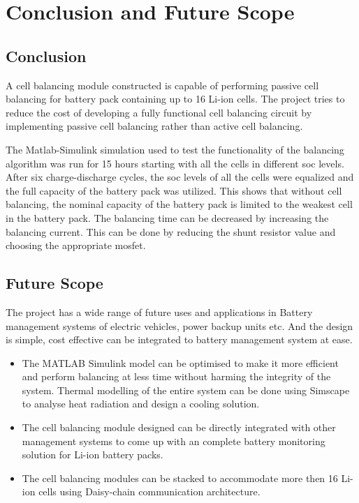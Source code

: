 \chapter{Conclusion and Future Scope}

\section{Conclusion}
\indent\indent A cell balancing module constructed is capable of performing passive cell balancing for battery pack containing up to 16 Li-ion cells.
The project tries to reduce the cost of developing a fully functional cell balancing circuit by implementing passive cell balancing rather than active cell balancing.

The Matlab\textsuperscript{\textregistered}-Simulink\textsuperscript{\textregistered} simulation used to test the functionality of the balancing algorithm was run for 15 hours starting with all the cells in different \acrshort{soc} levels. After six charge-discharge cycles, the \acrshort{soc} levels of all the cells were equalized and the full capacity of the battery pack was utilized. This shows that without cell balancing, the nominal capacity of the battery pack is limited to the weakest cell in the battery pack. The balancing time can be decreased by increasing the balancing current. This can be done by reducing the shunt resistor value and choosing the appropriate \acrshort{mosfet}.    



\section{Future Scope}
The project has a wide range of future uses and applications in Battery management systems of electric vehicles, power backup units etc. And the design is simple, cost effective can be integrated to battery management system at ease.

\begin{itemize}
\item The MATLAB\textsuperscript{\textregistered} Simulink\textsuperscript{\textregistered} model can be optimised to make it more efficient and perform balancing at less time without harming the integrity of the system. Thermal modelling of the entire system can be done using Simscape\textsuperscript{\textregistered} to analyse heat radiation and design a cooling solution.
\item The cell balancing module designed can be directly integrated with other management systems to come up with an complete battery monitoring solution for Li-ion battery packs. 
\item The cell balancing modules can be stacked to accommodate more then 16 Li-ion cells using Daisy-chain communication architecture.
\end{itemize}

